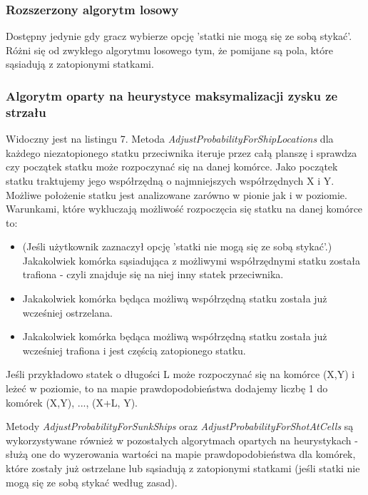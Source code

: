 \subsubsection{Rozszerzony algorytm losowy}
Dostępny jedynie gdy gracz wybierze opcję 'statki nie mogą się ze sobą stykać'. Różni się od zwykłego algorytmu losowego tym, że pomijane są pola, które sąsiadują z zatopionymi statkami.

\subsubsection{Algorytm oparty na heurystyce maksymalizacji zysku ze strzału}
Widoczny jest na listingu 7. Metoda \emph{AdjustProbabilityForShipLocations} dla każdego niezatopionego statku przeciwnika iteruje przez całą planszę i sprawdza czy początek statku może rozpoczynać się na danej komórce. Jako początek statku traktujemy jego współrzędną o najmniejszych współrzędnych X i Y. Możliwe położenie statku jest analizowane zarówno w pionie jak i w poziomie. Warunkami, które wykluczają możliwość rozpoczęcia się statku na danej komórce to:
\begin{itemize}
    \item (Jeśli użytkownik zaznaczył opcję 'statki nie mogą się ze sobą stykać'.) Jakakolwiek komórka sąsiadująca z możliwymi współrzędnymi statku została trafiona - czyli znajduje się na niej inny statek przeciwnika.
    \item Jakakolwiek komórka będąca możliwą współrzędną statku została już wcześniej ostrzelana.
    \item Jakakolwiek komórka będąca możliwą współrzędną statku została już wcześniej trafiona i jest częścią zatopionego statku.
\end{itemize}
Jeśli przykładowo statek o długości L może rozpoczynać się na komórce (X,Y) i leżeć w poziomie, to na mapie prawdopodobieństwa dodajemy liczbę 1 do komórek (X,Y), ..., (X+L, Y).


Metody \emph{AdjustProbabilityForSunkShips} oraz \emph{AdjustProbabilityForShotAtCells} są wykorzystywane również w pozostałych algorytmach opartych na heurystykach - służą one do wyzerowania wartości na mapie prawdopodobieństwa dla komórek, które zostały już ostrzelane lub sąsiadują z zatopionymi statkami (jeśli statki nie mogą się ze sobą stykać według zasad).

